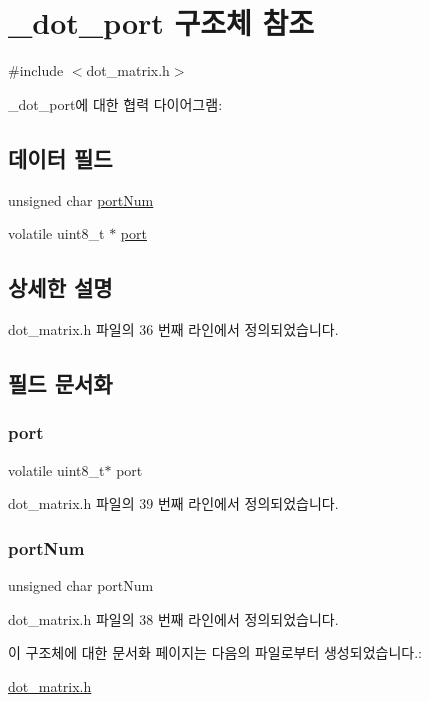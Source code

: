\hypertarget{struct__dot__port}{}\section{\+\_\+dot\+\_\+port 구조체 참조}
\label{struct__dot__port}


{\ttfamily \#include $<$dot\+\_\+matrix.\+h$>$}



\+\_\+dot\+\_\+port에 대한 협력 다이어그램\+:
\subsection*{데이터 필드}
\begin{DoxyCompactItemize}
\item 
unsigned char \hyperlink{struct__dot__port_a96ed4cdf432ec894de51f1c6246bdb29}{port\+Num}
\item 
volatile uint8\+\_\+t $\ast$ \hyperlink{struct__dot__port_adfcfd7f304a337776b36f479221f197c}{port}
\end{DoxyCompactItemize}


\subsection{상세한 설명}


dot\+\_\+matrix.\+h 파일의 36 번째 라인에서 정의되었습니다.



\subsection{필드 문서화}
\mbox{\label{struct__dot__port_adfcfd7f304a337776b36f479221f197c}} 
\subsubsection{\texorpdfstring{port}{port}}
{\footnotesize\ttfamily volatile uint8\+\_\+t$\ast$ port}



dot\+\_\+matrix.\+h 파일의 39 번째 라인에서 정의되었습니다.

\mbox{\label{struct__dot__port_a96ed4cdf432ec894de51f1c6246bdb29}} 
\subsubsection{\texorpdfstring{port\+Num}{portNum}}
{\footnotesize\ttfamily unsigned char port\+Num}



dot\+\_\+matrix.\+h 파일의 38 번째 라인에서 정의되었습니다.



이 구조체에 대한 문서화 페이지는 다음의 파일로부터 생성되었습니다.\+:\begin{DoxyCompactItemize}
\item 
\hyperlink{dot__matrix_8h}{dot\+\_\+matrix.\+h}\end{DoxyCompactItemize}
